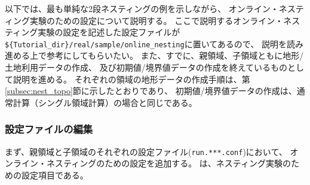 以下では、最も単純な2段ネスティングの例を示しながら、
オンライン・ネスティング実験のための設定について説明する。
ここで説明するオンライン・ネスティング実験の設定を記述した設定ファイルが
\verb|${Tutorial_dir}/real/sample/online_nesting|に置いてあるので、
説明を読み進める上で参考にしてもらいたい。
また、すでに、親領域、子領域ともに地形/土地利用データの作成、
及び初期値/境界値データの作成を終えているものとして説明を進める。
それぞれの領域の地形データの作成手順は、第\ref{subsec:nest_topo}節に示したとおりであり、
初期値/境界値データの作成は、通常計算（シングル領域計算）の場合と同じである。


\subsubsection{設定ファイルの編集}
まず、親領域と子領域のそれぞれの設定ファイル(\verb|run.***.conf|)において、
オンライン・ネスティングのための設定を追加する。
は、ネスティング実験のための設定項目である。\\

\\
{\small {\gt
{}}}\\

